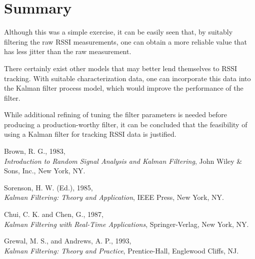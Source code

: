 \documentclass[12pt]{article}
\begin{document}
%
%

\section{Summary}

Although this was a simple exercise, it can be easily seen that, by suitably filtering the
raw RSSI measurements, one can obtain a more reliable value that has less jitter than the
raw measurement.

There certainly exist other models that may better lend themselves to RSSI tracking. With
suitable characterization data, one can incorporate this data into the Kalman filter
process model, which would improve the performance of the filter.

While additional refining of tuning the filter parameters is needed before producing a
production-worthy filter, it can be concluded that the feasibility of using a Kalman filter
for tracking RSSI data is justified.



\renewcommand{\refname}{\normalsize{General References}}

\begin{thebibliography}{9}

Brown, R. G., 1983, \\
\emph{Introduction to Random Signal Analysis and Kalman Filtering},
John Wiley \& Sons, Inc., New York, NY.

Sorenson, H. W. (Ed.), 1985, \\
\emph{Kalman Filtering: Theory and Application},
IEEE Press, New York, NY.

Chui, C. K. and Chen, G., 1987, \\
\emph{Kalman Filtering with Real-Time Applications},
Springer-Verlag, New York, NY.

Grewal, M. S., and Andrews, A. P., 1993, \\
\emph{Kalman Filtering: Theory and Practice},
Prentice-Hall, Englewood Cliffs, NJ.

\end{thebibliography}
\end{document}
